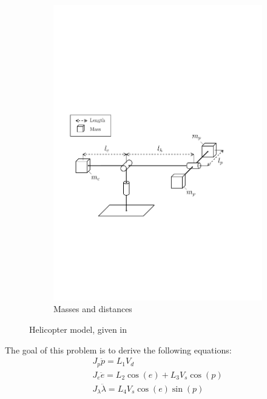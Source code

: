 \begin{figure}[h]
\begin{subfigure}{0.49\textwidth}
        \includegraphics[width = \textwidth]{figures/masses.pdf}
        \caption{Masses and distances}
        \label{fig:masses}
    \end{subfigure}
    \caption{Helicopter model, given in \cite{assignment}}
    \label{fig:model}
\end{figure}
The goal of this problem is to derive the following equations:
\begin{subequations} \label{eq:model}
    \begin{gather}
        J_p \ddot{p} = L_1 V_d \label{eq:model_pitch}\\
        J_e \ddot{e} = L_2 \cos(e) + L_3 V_s \cos(p) \label{eq:model_elev}\\
        J_{\lambda} \ddot{\lambda} = L_4 V_s \cos(e) \sin(p) \label{eq:model_travel}
    \end{gather}
\end{subequations}
